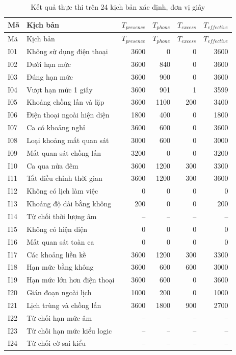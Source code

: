 \begingroup
\small
\setlength{\tabcolsep}{4pt}
\begin{longtable}{p{0.65cm}p{4.2cm}rrrr}
\caption{Kết quả thực thi trên 24 kịch bản xác định, đơn vị giây}\label{tab:interval-checks}\\
\toprule
Mã & Kịch bản & $T_{presence}$ & $T_{phone}$ & $T_{excess}$ & $T_{effective}$\\
\midrule\endfirsthead
\toprule
Mã & Kịch bản & $T_{presence}$ & $T_{phone}$ & $T_{excess}$ & $T_{effective}$\\
\midrule\endhead
\bottomrule\endfoot
I01 & Không sử dụng điện thoại & 3600 & 0 & 0 & 3600\\
I02 & Dưới hạn mức & 3600 & 840 & 0 & 3600\\
I03 & Đúng hạn mức & 3600 & 900 & 0 & 3600\\
I04 & Vượt hạn mức 1 giây & 3600 & 901 & 1 & 3599\\
I05 & Khoảng chồng lấn và lặp & 3600 & 1100 & 200 & 3400\\
I06 & Điện thoại ngoài hiện diện & 1800 & 400 & 0 & 1800\\
I07 & Ca có khoảng nghỉ & 3600 & 600 & 0 & 3600\\
I08 & Loại khoảng mất quan sát & 3000 & 600 & 0 & 3000\\
I09 & Mất quan sát chồng lấn & 3200 & 0 & 0 & 3200\\
I10 & Ca qua nửa đêm & 3600 & 1200 & 300 & 3300\\
I11 & Tắt điều chỉnh thời gian & 3600 & 1200 & 300 & 3600\\
I12 & Không có lịch làm việc & 0 & 0 & 0 & 0\\
I13 & Khoảng độ dài bằng không & 200 & 0 & 0 & 200\\
I14 & Từ chối thời lượng âm & -- & -- & -- & --\\
I15 & Không có hiện diện & 0 & 0 & 0 & 0\\
I16 & Mất quan sát toàn ca & 0 & 0 & 0 & 0\\
I17 & Các khoảng liền kề & 3600 & 1200 & 300 & 3300\\
I18 & Hạn mức bằng không & 3600 & 600 & 600 & 3000\\
I19 & Hạn mức lớn hơn điện thoại & 3600 & 600 & 0 & 3600\\
I20 & Gián đoạn ngoài lịch & 1000 & 200 & 0 & 1000\\
I21 & Lịch trùng và chồng lấn & 3600 & 1800 & 900 & 2700\\
I22 & Từ chối hạn mức âm & -- & -- & -- & --\\
I23 & Từ chối hạn mức kiểu logic & -- & -- & -- & --\\
I24 & Từ chối cờ sai kiểu & -- & -- & -- & --\\
\end{longtable}
\endgroup

